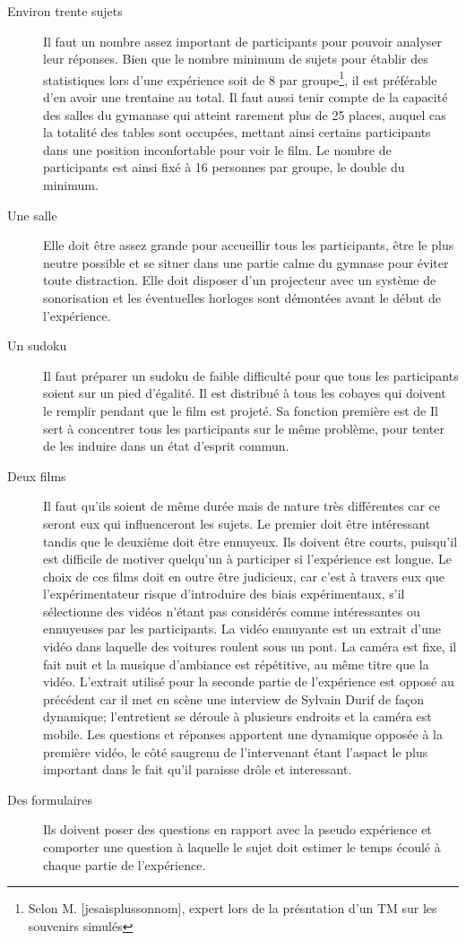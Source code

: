 \documentclass[12pt,fleqn,oneside]{book} %
\begin{document}
\begin{description}
	\item[Environ trente sujets] Il faut un nombre assez important de participants pour pouvoir analyser leur réponses. Bien que le nombre minimum de sujets pour établir des statistiques lors d'une expérience soit de 8 par groupe\footnote{Selon M. [jesaisplussonnom], expert lors de la présntation d'un TM sur les souvenirs simulés}, il est préférable d'en avoir une trentaine au total. Il faut aussi tenir compte de la capacité des salles du gymanase qui atteint rarement plus de 25 places, auquel cas la totalité des tables sont occupées, mettant ainsi certains participants dans une position inconfortable pour voir le film. Le nombre de participants est ainsi fixé à 16 personnes par groupe, le double du minimum.
	\item[Une salle] Elle doit être assez grande pour accueillir tous les participants, être le plus neutre possible et se situer dans une partie calme du gymnase pour éviter toute distraction. Elle doit disposer d'un projecteur avec un système de sonorisation et les éventuelles horloges sont démontées avant le début de l'expérience.
	\item[Un sudoku] Il faut préparer un sudoku de faible difficulté pour que tous les participants soient sur un pied d'égalité. Il est distribué à tous les cobayes qui doivent le remplir pendant que le film est projeté. Sa fonction première est de 
	Il sert à concentrer tous les participants sur le même problème, pour tenter de les induire dans un état d'esprit commun. 
	\item[Deux films] Il faut qu'ils soient de même durée mais de nature très différentes car ce seront eux qui influenceront les sujets. Le premier doit être intéressant tandis que le deuxième doit être ennuyeux. Ils doivent être courts, puisqu'il est difficile de motiver quelqu'un à participer si l'expérience est longue. Le choix de ces films doit en outre être judicieux, car c'est à travers eux que l'expérimentateur risque d'introduire des biais expérimentaux, s'il sélectionne des vidéos n'étant pas considérés comme intéressantes ou ennuyeuses par les participants. La vidéo ennuyante est un extrait d'une vidéo dans laquelle des voitures roulent sous un pont. La caméra est fixe, il fait nuit et la musique d'ambiance est répétitive, au même titre que la vidéo. L'extrait utilisé pour la seconde partie de l'expérience est opposé au précédent car il met en scène une interview de Sylvain Durif de façon dynamique; l'entretient se déroule à plusieurs endroits et la caméra est mobile. Les questions et réponses apportent une dynamique opposée à la première vidéo, le côté saugrenu de l'intervenant étant l'aspact le plus important dans le fait qu'il paraisse drôle et interessant.
	\item[Des formulaires] Ils doivent poser des questions en rapport avec la pseudo expérience et comporter une question à laquelle le sujet doit estimer le temps écoulé à chaque partie de l'expérience.
\end{description}
\end{document}
